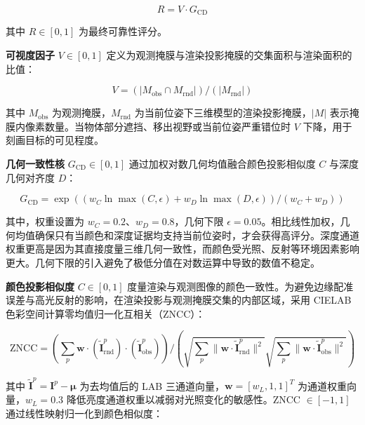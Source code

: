 \documentclass[review]{vgtc}
\begin{document}
\begin{equation}
R = V \cdot G_{\mathrm{CD}}
\label{eq:reliability}
\end{equation}


其中 $R \in [0,1]$ 为最终可靠性评分。

\textbf{可视度因子} $V \in [0,1]$ 定义为观测掩膜与渲染投影掩膜的交集面积与渲染面积的比值：

\begin{equation}
V = (\lvert M_{\mathrm{obs}} \cap M_{\mathrm{rnd}} \rvert) / (\lvert M_{\mathrm{rnd}} \rvert)
\label{eq:visibility}
\end{equation}


其中 $M_{\mathrm{obs}}$ 为观测掩膜，$M_{\mathrm{rnd}}$ 为当前位姿下三维模型的渲染投影掩膜，$\lvert M \rvert$ 表示掩膜内像素数量。当物体部分遮挡、移出视野或当前位姿严重错位时 $V$ 下降，用于刻画目标的可见程度。

\textbf{几何一致性核} $G_{\mathrm{CD}} \in [0,1]$ 通过加权对数几何均值融合颜色投影相似度 $C$ 与深度几何对齐度 $D$：

\begin{equation}
G_{\mathrm{CD}} = \exp\!\left((w_C \ln \max\!\left(C, \epsilon\right) + w_D \ln \max\!\left(D, \epsilon\right)) / (w_C + w_D)\right)
\label{eq:cd-consistency}
\end{equation}


其中，权重设置为 $w_C = 0.2$、$w_D = 0.8$，几何下限 $\epsilon = 0.05$。相比线性加权，几何均值确保只有当颜色和深度证据均支持当前位姿时，才会获得高评分。深度通道权重更高是因为其直接度量三维几何一致性，而颜色受光照、反射等环境因素影响更大。几何下限的引入避免了极低分值在对数运算中导致的数值不稳定。

\textbf{颜色投影相似度} $C \in [0,1]$ 度量渲染与观测图像的颜色一致性。为避免边缘配准误差与高光反射的影响，在渲染投影与观测掩膜交集的内部区域，采用 CIELAB 色彩空间计算零均值归一化互相关（ZNCC）：

\begin{equation}
\mathrm{ZNCC} = (\sum_{p} \mathbf{w} \cdot (\widetilde{\mathbf{I}}_{\mathrm{rnd}}^p) \cdot (\widetilde{\mathbf{I}}_{\mathrm{obs}}^p)) / (\sqrt{\sum_{p} \lVert \mathbf{w} \cdot \widetilde{\mathbf{I}}_{\mathrm{rnd}}^p \rVert^2} \sqrt{\sum_{p} \lVert \mathbf{w} \cdot \widetilde{\mathbf{I}}_{\mathrm{obs}}^p \rVert^2})
\label{eq:zncc}
\end{equation}


其中 $\widetilde{\mathbf{I}}^p = \mathbf{I}^p - \mathbf{\mu}$ 为去均值后的 LAB 三通道向量，$\mathbf{w} = [w_L, 1, 1]^T$ 为通道权重向量，$w_L = 0.3$ 降低亮度通道权重以减弱对光照变化的敏感性。ZNCC $\in [-1,1]$ 通过线性映射归一化到颜色相似度：
\end{document}
